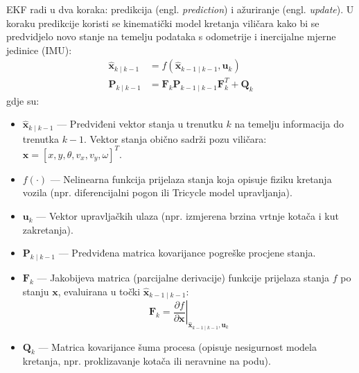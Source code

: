 \documentclass[12pt,a4paper]{article}
\begin{document}
EKF radi u dva koraka: predikcija (engl. \textit{prediction}) i ažuriranje (engl. \textit{update}). U koraku predikcije koristi se kinematički model kretanja viličara kako bi se predvidjelo novo stanje na temelju podataka s odometrije i inercijalne mjerne jedinice (IMU):
\begin{align}
    \mathbf{\hat{x}}_{k \mid k-1} &= f(\mathbf{\hat{x}}_{k-1 \mid k-1}, \mathbf{u}_k) \\
    \mathbf{P}_{k \mid k-1} &= \mathbf{F}_k \mathbf{P}_{k-1 \mid k-1} \mathbf{F}_k^T + \mathbf{Q}_k
\end{align}
gdje su:
\begin{itemize}
    \item $\mathbf{\hat{x}}_{k \mid k-1}$ — Predviđeni vektor stanja u trenutku $k$ na temelju informacija do trenutka $k-1$. Vektor stanja obično sadrži pozu viličara: $\mathbf{x} = [x, y, \theta, v_x, v_y, \omega]^T$.
    \item $f(\cdot)$ — Nelinearna funkcija prijelaza stanja koja opisuje fiziku kretanja vozila (npr. diferencijalni pogon ili Tricycle model upravljanja).
    \item $\mathbf{u}_k$ — Vektor upravljačkih ulaza (npr. izmjerena brzina vrtnje kotača i kut zakretanja).
    \item $\mathbf{P}_{k \mid k-1}$ — Predviđena matrica kovarijance pogreške procjene stanja.
    \item $\mathbf{F}_k$ — Jakobijeva matrica (parcijalne derivacije) funkcije prijelaza stanja $f$ po stanju $\mathbf{x}$, evaluirana u točki $\mathbf{\hat{x}}_{k-1 \mid k-1}$:
    \begin{equation}
        \mathbf{F}_k = \left. \frac{\partial f}{\partial \mathbf{x}} \right|_{\mathbf{\hat{x}}_{k-1 \mid k-1}, \mathbf{u}_k}
    \end{equation}
    \item $\mathbf{Q}_k$ — Matrica kovarijance šuma procesa (opisuje nesigurnost modela kretanja, npr. proklizavanje kotača ili neravnine na podu).
\end{itemize}
\end{document}
